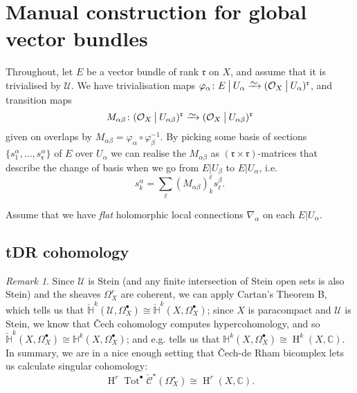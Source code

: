 \documentclass[11pt,fleqn]{article}
\theoremstyle{plain}
\theoremstyle{definition}
\theoremstyle{remark}
\newtheorem{remark}[theorem]{Remark}
\numberwithin{equation}{theorem}
\newcommand{\cover}{\mathcal{U}}
\newcommand{\OO}{\mathcal{O}}
\newcommand{\anotherbullet}{\star}
\newcommand{\restricted}{\mathbin{\big\vert}}
\newcommand{\congto}{\xrightarrow{\raisebox{-.5ex}[0ex][0ex]{$\sim$}}}
\newcommand{\cech}{\check{\mathscr{C}}}
\DeclareMathOperator{\Tot}{Tot}
\DeclareMathOperator{\HH}{H}
\begin{document}
\section{Manual construction for global vector bundles}\label{section:manual-construction}


    Throughout, let $E$ be a vector bundle of rank $\mathfrak{r}$ on $X$, and assume that it is trivialised by $\cover$.
    We have trivialisation maps $\varphi_\alpha\colon E\restricted U_\alpha\congto(\OO_X\restricted U_\alpha)^\mathfrak{r}$, and transition maps
    \[
        M_{\alpha\beta}\colon(\OO_X\restricted{U_{\alpha\beta}})^\mathfrak{r}\congto(\OO_X\restricted{U_{\alpha\beta}})^\mathfrak{r}
    \]
    given on overlaps by \mbox{$M_{\alpha\beta}=\varphi_\alpha\circ\varphi_\beta^{-1}$}.
    By picking some basis of sections $\{s^{\alpha}_1,\ldots,s^{\alpha}_\mathfrak{r}\}$ of $E$ over $U_\alpha$ we can realise the $M_{\alpha\beta}$ as $(\mathfrak{r}\times\mathfrak{r})$-matrices that describe the change of basis when we go from $E\restricted U_\beta$ to $E\restricted U_\alpha$, i.e.
    \begin{equation}
    \label{equation:transition-maps}
        s^\alpha_k = \sum_\ell(M_{\alpha\beta})_k^\ell s^\beta_\ell.
    \end{equation}

    Assume that we have \emph{flat} holomorphic local connections $\nabla_\alpha$ on each $E\restricted U_\alpha$.

    \subsection{tDR cohomology}

        \begin{remark}\label{remark:we-can-calculate-in-cech}
            Since $\cover$ is Stein (and any finite intersection of Stein open sets is also Stein) and the sheaves $\Omega_X^r$ are coherent, we can apply Cartan's Theorem B, which tells us that $\check{\mathbb{H}}^k(\cover,\Omega_X^\bullet) \cong \check{\mathbb{H}}^k(X,\Omega_X^\bullet)$; since $X$ is paracompact and $\cover$ is Stein, we know that Čech cohomology computes hypercohomology, and so $\check{\mathbb{H}}^k(X,\Omega_X^\bullet) \cong \mathbb{H}^k(X,\Omega_X^\bullet)$; and e.g. \cite[Theorem~8.1]{Voisin2002a} tells us that $\mathbb{H}^k(X,\Omega_X^\bullet) \cong \HH^k\left(X,\mathbb{C}\right)$.
            In summary, we are in a nice enough setting that Čech-de Rham bicomplex lets us calculate singular cohomology:
            \begin{equation*}
                \HH^r\Tot^\bullet\cech^\anotherbullet\left(\Omega^\anotherbullet_X\right) \cong \HH^r\left(X,\mathbb{C}\right).
            \end{equation*}
        \end{remark}
\end{document}
